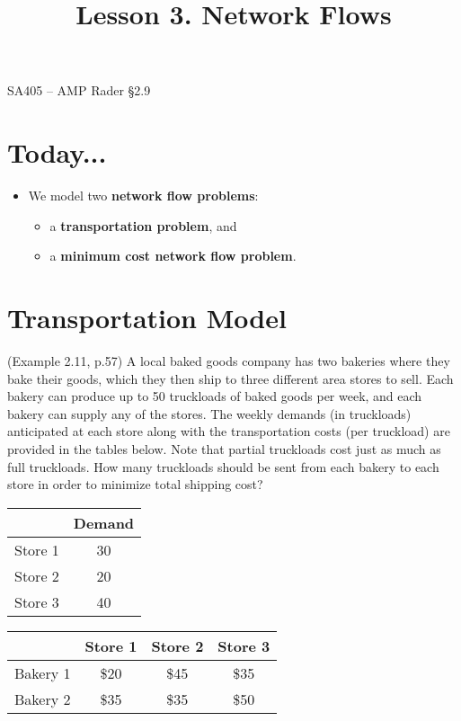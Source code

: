 \documentclass[11pt]{article}
\makeatletter
\theoremstyle{definition}
\renewcommand{\maketitle}{
  \noindent SA405 -- AMP \hfill Rader \S 2.9 \\

  \begin{center}\Large{\textbf{\@title}}\end{center}
}
\makeatother
\begin{document}
  
\title{Lesson 3. Network Flows}


\maketitle

\section{Today...}

\begin{itemize}
	\item  We model two \textbf{network flow problems}:
	\begin{itemize}
		\item a \textbf{transportation problem}, and
		\item a \textbf{minimum cost network flow problem}.
	\end{itemize}
\end{itemize}

\section{Transportation Model}
(Example 2.11, p.57) A local baked goods company has two bakeries where they bake their goods, which they then ship to three different area stores to sell.  Each bakery can produce up to 50 truckloads of baked goods per week, and each bakery can supply any of the stores.  The weekly demands (in truckloads) anticipated at each store along with the transportation costs (per truckload) are provided in the tables below.  Note that partial truckloads cost just as much as full truckloads.  How many truckloads should be sent from each bakery to each store in order to minimize total shipping cost?  
\begin{center}
\begin{tabular}{|c|c|}
\hline
 & Demand \\
\hline
Store 1 & 30 \\
\hline
Store 2 & 20 \\
\hline
Store 3 & 40 \\
\hline
\end{tabular}
\hspace{1cm}
\begin{tabular}{|c|c|c|c|}
\hline
& Store 1 & Store 2 & Store 3 \\
\hline
Bakery 1 & \$20 & \$45 & \$35 \\
\hline
Bakery 2 & \$35 & \$35 & \$50 \\
\hline
\end{tabular}
\end{center}
\end{document}
